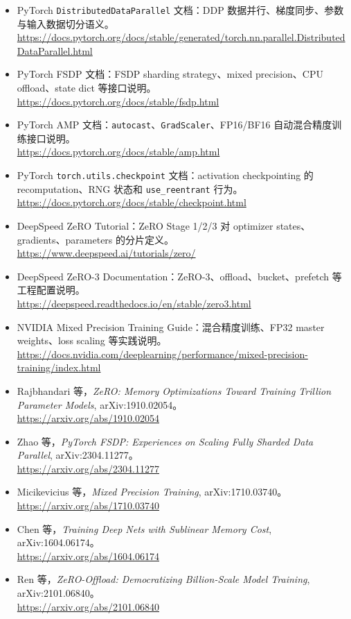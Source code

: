 \begingroup
\small
\sloppy
\begin{itemize}[leftmargin=1.5em]
  \item PyTorch \texttt{DistributedDataParallel} 文档：DDP 数据并行、梯度同步、参数与输入数据切分语义。\\
  \url{https://docs.pytorch.org/docs/stable/generated/torch.nn.parallel.DistributedDataParallel.html}
  \item PyTorch FSDP 文档：FSDP sharding strategy、mixed precision、CPU offload、state dict 等接口说明。\\
  \url{https://docs.pytorch.org/docs/stable/fsdp.html}
  \item PyTorch AMP 文档：\texttt{autocast}、\texttt{GradScaler}、FP16/BF16 自动混合精度训练接口说明。\\
  \url{https://docs.pytorch.org/docs/stable/amp.html}
  \item PyTorch \texttt{torch.utils.checkpoint} 文档：activation checkpointing 的 recomputation、RNG 状态和 \texttt{use\_reentrant} 行为。\\
  \url{https://docs.pytorch.org/docs/stable/checkpoint.html}
  \item DeepSpeed ZeRO Tutorial：ZeRO Stage 1/2/3 对 optimizer states、gradients、parameters 的分片定义。\\
  \url{https://www.deepspeed.ai/tutorials/zero/}
  \item DeepSpeed ZeRO-3 Documentation：ZeRO-3、offload、bucket、prefetch 等工程配置说明。\\
  \url{https://deepspeed.readthedocs.io/en/stable/zero3.html}
  \item NVIDIA Mixed Precision Training Guide：混合精度训练、FP32 master weights、loss scaling 等实践说明。\\
  \url{https://docs.nvidia.com/deeplearning/performance/mixed-precision-training/index.html}
  \item Rajbhandari 等，\emph{ZeRO: Memory Optimizations Toward Training Trillion Parameter Models}, arXiv:1910.02054。\\
  \url{https://arxiv.org/abs/1910.02054}
  \item Zhao 等，\emph{PyTorch FSDP: Experiences on Scaling Fully Sharded Data Parallel}, arXiv:2304.11277。\\
  \url{https://arxiv.org/abs/2304.11277}
  \item Micikevicius 等，\emph{Mixed Precision Training}, arXiv:1710.03740。\\
  \url{https://arxiv.org/abs/1710.03740}
  \item Chen 等，\emph{Training Deep Nets with Sublinear Memory Cost}, arXiv:1604.06174。\\
  \url{https://arxiv.org/abs/1604.06174}
  \item Ren 等，\emph{ZeRO-Offload: Democratizing Billion-Scale Model Training}, arXiv:2101.06840。\\
  \url{https://arxiv.org/abs/2101.06840}
\end{itemize}
\endgroup
